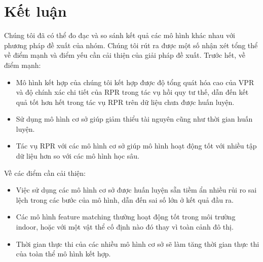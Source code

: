 \section{Kết luận}
Chúng tôi đã có thể đo đạc và so sánh kết quả các mô hình khác nhau với phương pháp đề xuất của nhóm. Chúng tôi rút ra được một số nhận xét tổng thể về điểm mạnh và điểm yếu cần cải thiện của giải pháp đề xuất. Trước hết, về điểm mạnh:
\begin{itemize}
	\item Mô hình kết hợp của chúng tôi kết hợp được độ tổng quát hóa cao của VPR và độ chính xác chi tiết của RPR trong tác vụ hồi quy tư thế, dẫn đến kết quả tốt hơn hết trong tác vụ RPR trên dữ liệu chưa được huấn luyện.
	\item Sử dụng mô hình cơ sở giúp giảm thiểu tài nguyên cũng như thời gian huấn luyện.
	\item Tác vụ RPR với các mô hình cơ sở giúp mô hình hoạt động tốt với nhiều tập dữ liệu hơn so với các mô hình học sâu.
\end{itemize}
Về các điểm cần cải thiện:
\begin{itemize}
	\item Việc sử dụng các mô hình cơ sở được huấn luyện sẵn tiềm ẩn nhiều rủi ro sai lệch trong các bước của mô hình, dẫn đến sai số lớn ở kết quả đầu ra.
	\item Các mô hình feature matching thường hoạt động tốt trong môi trường indoor, hoặc với một vật thể cố định nào đó thay vì toàn cảnh đô thị.
	\item Thời gian thực thi của các nhiều mô hình cơ sở sẽ làm tăng thời gian thực thi của toàn thể mô hình kết hợp.
\end{itemize}